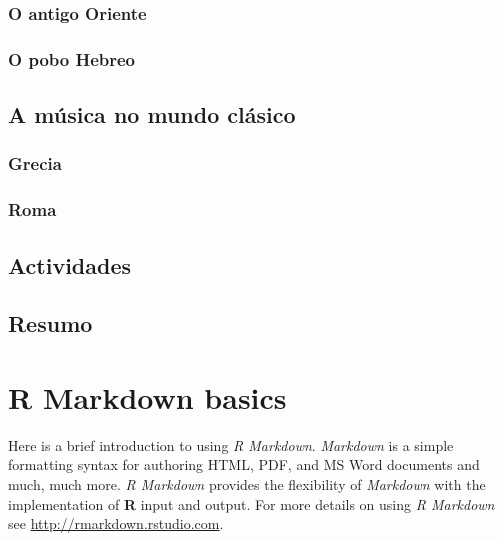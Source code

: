\documentclass[a4paper, twoside]{templates/ociamthesis}
\theoremstyle{definition}
\theoremstyle{definition}
\theoremstyle{definition}
\theoremstyle{definition}
\theoremstyle{remark}
\begin{document}
\hypertarget{o-antigo-oriente}{%
\subsection{O antigo Oriente}\label{o-antigo-oriente}}

\hypertarget{o-pobo-hebreo}{%
\subsection{O pobo Hebreo}\label{o-pobo-hebreo}}

\hypertarget{a-muxfasica-no-mundo-cluxe1sico}{%
\section{A música no mundo clásico}\label{a-muxfasica-no-mundo-cluxe1sico}}

\hypertarget{grecia}{%
\subsection{Grecia}\label{grecia}}

\hypertarget{roma}{%
\subsection{Roma}\label{roma}}

\hypertarget{actividades}{%
\section{Actividades}\label{actividades}}

\hypertarget{resumo}{%
\section{Resumo}\label{resumo}}

\hypertarget{rmd-basics}{%
\chapter{R Markdown basics}\label{rmd-basics}}

\minitoc 

\noindent Here is a brief introduction to using \emph{R Markdown}.
\emph{Markdown} is a simple formatting syntax for authoring HTML, PDF, and MS Word documents and much, much more.
\emph{R Markdown} provides the flexibility of \emph{Markdown} with the implementation of \textbf{R} input and output. For more details on using \emph{R Markdown} see \url{http://rmarkdown.rstudio.com}.
\end{document}
